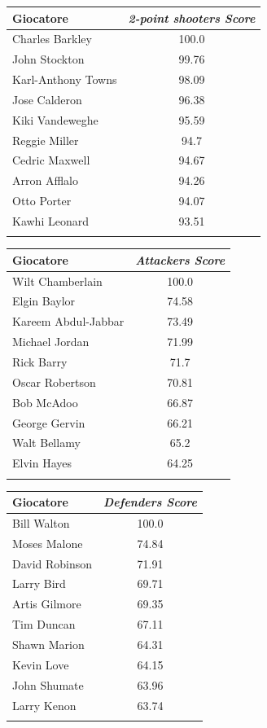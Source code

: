 \documentclass[10.5pt,a4paper,twocolumn]{article}
\begin{document}
\begin{table}[t]
{\begin{tabular}{lc}
		\end{tabular}
	}
	\quad
	\hspace{19pt}
	\parbox{.45\linewidth}{
		\begin{tabular}{lc}
			Giocatore & \textit{2-point shooters Score}  \\
			\hline
			Charles Barkley & 100.0\\
			John Stockton & 99.76\\
			Karl-Anthony Towns & 98.09\\
			Jose Calderon & 96.38\\
			Kiki Vandeweghe & 95.59\\
			Reggie Miller & 94.7\\
			Cedric Maxwell & 94.67\\
			Arron Afflalo & 94.26\\
			Otto Porter & 94.07\\
			Kawhi Leonard & 93.51\\
			&\\
			
	\end{tabular}}
	
	\parbox{.45\linewidth}{
		\begin{tabular}{lc}
			Giocatore & \textit{Attackers Score}  \\
			\hline
			Wilt Chamberlain & 100.0\\
			Elgin Baylor & 74.58\\
			Kareem Abdul-Jabbar & 73.49\\
			Michael Jordan & 71.99\\
			Rick Barry & 71.7\\
			Oscar Robertson & 70.81\\
			Bob McAdoo & 66.87\\
			George Gervin & 66.21\\
			Walt Bellamy & 65.2\\
			Elvin Hayes & 64.25\\
			&\\
			
		\end{tabular}
	}
	\quad
	\hspace{19pt}
	\parbox{.45\linewidth}{
		\begin{tabular}{lc}
			Giocatore & \textit{Defenders Score}  \\
			\hline
			Bill Walton & 100.0\\
			Moses Malone & 74.84\\
			David Robinson & 71.91\\
			Larry Bird & 69.71\\
			Artis Gilmore & 69.35\\
			Tim Duncan & 67.11\\
			Shawn Marion & 64.31\\
			Kevin Love & 64.15\\
			John Shumate & 63.96\\
			Larry Kenon & 63.74\\
			&\\
			
	\end{tabular}}
	
\end{table}
\end{document}
